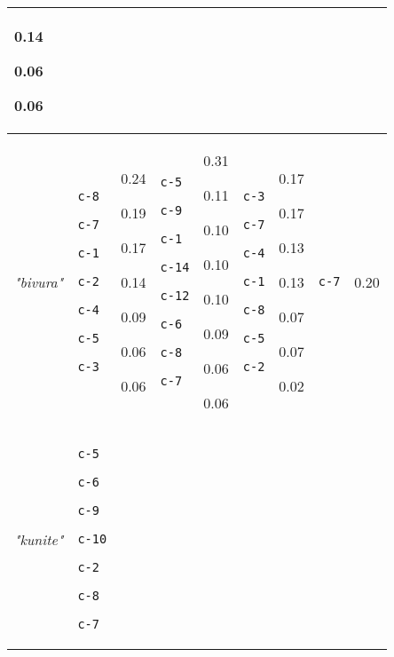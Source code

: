 {\begin{tabular}{@{}p{1.2cm}|p{1.3cm}@{}p{0.8cm}@{}|p{1.3cm}@{}p{0.8cm}@{}|p{1.3cm}@{}p{0.8cm}@{}|p{1.3cm}@{}p{0.8cm}@{}}
0.14

0.06

0.06\\
\hline
\textit{"bivura"} & \texttt{c-8}

\texttt{c-7}

\texttt{c-1}

\texttt{c-2}

\texttt{c-4}

\texttt{c-5}

\texttt{c-3} & 0.24

0.19

0.17

0.14

0.09

0.06

0.06 & \texttt{c-5}

\texttt{c-9}

\texttt{c-1}

\texttt{c-14}

\texttt{c-12}

\texttt{c-6}

\texttt{c-8}

\texttt{c-7} & 0.31

0.11

0.10

0.10

0.10

0.09

0.06

0.06 & \texttt{c-3}

\texttt{c-7}

\texttt{c-4}

\texttt{c-1}

\texttt{c-8}

\texttt{c-5}

\texttt{c-2} & 0.17

0.17

0.13

0.13

0.07

0.07

0.02 & \texttt{c-7} & 0.20\\
\hline
\textit{"kunite"} & \texttt{c-5}

\texttt{c-6}

\texttt{c-9}

\texttt{c-10}

\texttt{c-2}

\texttt{c-8}

\texttt{c-7}


\end{tabular}}
